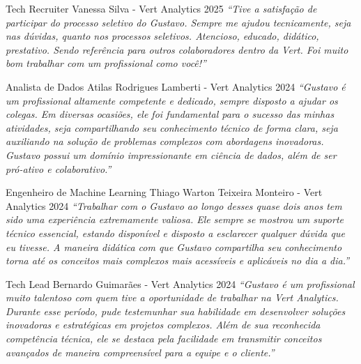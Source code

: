 \begin{cventries}
  \cventry
    {Tech Recruiter} %
    {Vanessa Silva - Vert Analytics} %
    {2025} %
    {} %
    {
      \textit{``Tive a satisfação de participar do processo seletivo do Gustavo. Sempre me ajudou tecnicamente, seja nas dúvidas, quanto nos processos seletivos. Atencioso, educado, didático, prestativo. Sendo referência para outros colaboradores dentro da Vert. Foi muito bom trabalhar com um profissional como você!''}
    }

  \cventry
    {Analista de Dados} %
    {Atilas Rodrigues Lamberti - Vert Analytics} %
    {2024} %
    {} %
    {
      \textit{``Gustavo é um profissional altamente competente e dedicado, sempre disposto a ajudar os colegas. Em diversas ocasiões, ele foi fundamental para o sucesso das minhas atividades, seja compartilhando seu conhecimento técnico de forma clara, seja auxiliando na solução de problemas complexos com abordagens inovadoras. Gustavo possui um domínio impressionante em ciência de dados, além de ser pró-ativo e colaborativo.''}
    }

  \cventry
    {Engenheiro de Machine Learning} %
    {Thiago Warton Teixeira Monteiro - Vert Analytics} %
    {2024} %
    {} %
    {
      \textit{``Trabalhar com o Gustavo ao longo desses quase dois anos tem sido uma experiência extremamente valiosa. Ele sempre se mostrou um suporte técnico essencial, estando disponível e disposto a esclarecer qualquer dúvida que eu tivesse. A maneira didática com que Gustavo compartilha seu conhecimento torna até os conceitos mais complexos mais acessíveis e aplicáveis no dia a dia.''}
    }

  \cventry
    {Tech Lead} %
    {Bernardo Guimarães - Vert Analytics} %
    {2024} %
    {} %
    {
      \textit{``Gustavo é um profissional muito talentoso com quem tive a oportunidade de trabalhar na Vert Analytics. Durante esse período, pude testemunhar sua habilidade em desenvolver soluções inovadoras e estratégicas em projetos complexos. Além de sua reconhecida competência técnica, ele se destaca pela facilidade em transmitir conceitos avançados de maneira compreensível para a equipe e o cliente.''}
    }


\end{cventries}
